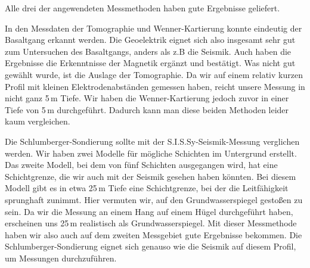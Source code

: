 Alle drei der angewendeten Messmethoden haben gute Ergebnisse geliefert.

In den Messdaten der Tomographie und Wenner-Kartierung konnte eindeutig der Basaltgang erkannt werden. Die Geoelektrik eignet sich also insgesamt sehr gut zum Untersuchen des Basaltgangs, anders als z.B die Seismik. Auch haben die Ergebnisse die Erkenntnisse der Magnetik ergänzt und bestätigt.
Was nicht gut gewählt wurde, ist die Auslage der Tomographie. Da wir auf einem relativ kurzen Profil mit kleinen Elektrodenabständen gemessen haben, reicht unsere Messung in nicht ganz 5\,m Tiefe. Wir haben die Wenner-Kartierung jedoch zuvor in einer Tiefe von 5\,m durchgeführt. Dadurch kann man diese beiden Methoden leider kaum vergleichen.

Die Schlumberger-Sondierung sollte mit der S.I.S.Sy-Seismik-Messung verglichen werden. Wir haben zwei Modelle für mögliche Schichten im Untergrund erstellt. Das zweite Modell, bei dem von fünf Schichten ausgegangen wird, hat eine Schichtgrenze, die wir auch mit der Seismik gesehen haben könnten. Bei diesem Modell gibt es in etwa 25\,m Tiefe eine Schichtgrenze, bei der die Leitfähigkeit sprunghaft zunimmt. Hier vermuten wir, auf den Grundwasserspiegel gestoßen zu sein. Da wir die Messung an einem Hang auf einem Hügel durchgeführt haben, erscheinen uns 25\,m realistisch als Grundwasserspiegel. Mit dieser Messmethode haben wir also auch auf dem zweiten Messgebiet gute Ergebnisse bekommen. Die Schlumberger-Sondierung eignet sich genauso wie die Seismik auf diesem Profil, um Messungen durchzuführen. 
